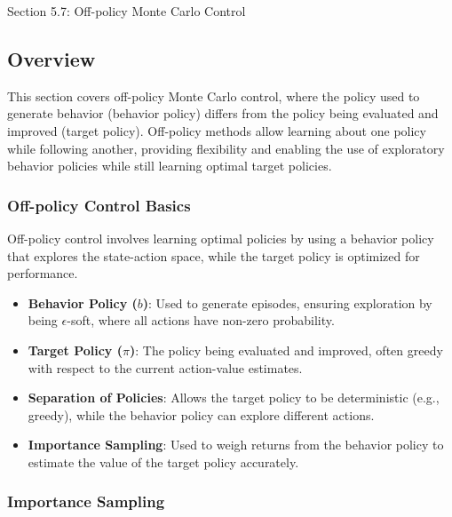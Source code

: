 \begin{notes}{Section 5.7: Off-policy Monte Carlo Control}
    \subsection*{Overview}

    This section covers off-policy Monte Carlo control, where the policy used to generate behavior (behavior policy) differs from the policy being evaluated and improved (target policy). Off-policy methods 
    allow learning about one policy while following another, providing flexibility and enabling the use of exploratory behavior policies while still learning optimal target policies.
    
    \subsubsection*{Off-policy Control Basics}
    
    Off-policy control involves learning optimal policies by using a behavior policy that explores the state-action space, while the target policy is optimized for performance.
    
    \begin{highlight}
    
        \begin{itemize}
            \item \textbf{Behavior Policy ($b$)}: Used to generate episodes, ensuring exploration by being $\epsilon$-soft, where all actions have non-zero probability.
            \item \textbf{Target Policy ($\pi$)}: The policy being evaluated and improved, often greedy with respect to the current action-value estimates.
            \item \textbf{Separation of Policies}: Allows the target policy to be deterministic (e.g., greedy), while the behavior policy can explore different actions.
            \item \textbf{Importance Sampling}: Used to weigh returns from the behavior policy to estimate the value of the target policy accurately.
        \end{itemize}
    
    \end{highlight}
    
    \subsubsection*{Importance Sampling}
    

\end{notes}
